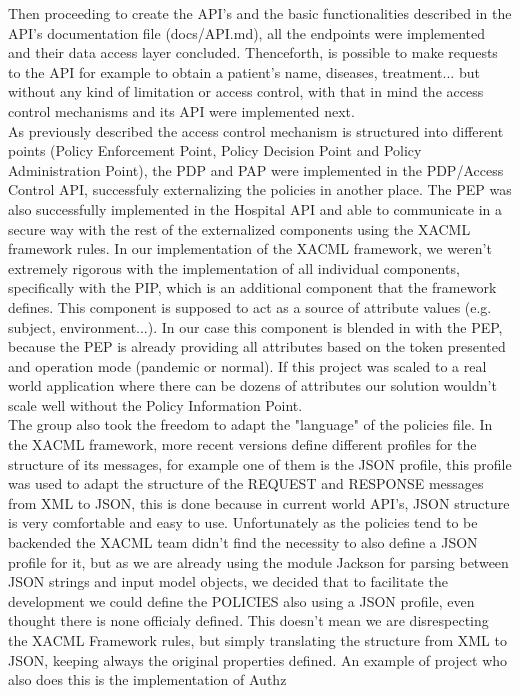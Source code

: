 Then proceeding to create the API's and the basic functionalities described in the API's documentation file (docs/API.md), all the endpoints were implemented and their data access layer concluded. Thenceforth, is possible to make requests to the API for example to obtain a patient's name, diseases, treatment... but without any kind of limitation or access control, with that in mind the access control mechanisms and its API were implemented next. \\

As previously described the access control mechanism is structured into different points (Policy Enforcement Point, Policy Decision Point and Policy Administration Point), the PDP and PAP were implemented in the PDP/Access Control API, successfuly externalizing the policies in another place. The PEP was also successfully implemented in the Hospital API and able to communicate in a secure way with the rest of the externalized components using the XACML framework rules. In our implementation of the XACML framework, we weren't extremely rigorous with the implementation of all individual components, specifically with the PIP, which is an additional component that the framework defines. This component is supposed to act as a source of attribute values (e.g. subject, environment...). In our case this component is blended in with the PEP, because the PEP is already providing all attributes based on the token presented and operation mode (pandemic or normal). If this project was scaled to a real world application where there can be dozens of attributes our solution wouldn't scale well without the Policy Information Point. \\

The group also took the freedom to adapt the "language" of the policies file. In the XACML framework, more recent versions define different profiles for the structure of its messages, for example one of them is the JSON profile, this profile was used to adapt the structure of the REQUEST and RESPONSE messages from XML to JSON, this is done because in current world API's, JSON structure is very comfortable and easy to use. Unfortunately as the policies tend to be backended the XACML team didn't find the necessity to also define a JSON profile for it, but as we are already using the module Jackson \cite{jackson} for parsing between JSON strings and input model objects, we decided that to facilitate the development we could define the POLICIES also using a JSON profile, even thought there is none officialy defined. This doesn't mean we are disrespecting the XACML Framework rules, but simply translating the structure from XML to JSON, keeping always the original properties defined. An example of project who also does this is the implementation of Authz \cite{authz} \\

